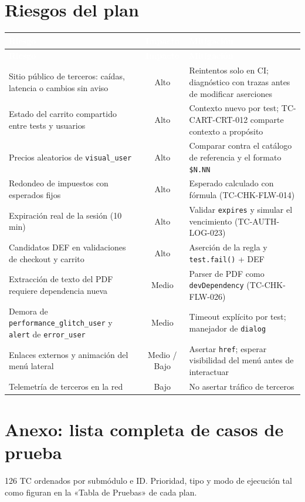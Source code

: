 \documentclass[10pt,a4paper]{article}
\newcommand{\tabhead}{\rowcolor{primary}}
\newcommand{\hcell}[1]{\textcolor{white}{\bfseries #1}}
\newcommand{\zebrarows}{\rowcolors{2}{zebra}{white}}
\begin{document}
\section{Riesgos del plan}
{\zebrarows
\begin{longtable}{|L{0.35\textwidth}|c|L{0.44\textwidth}|}
\hline
\tabhead \hcell{Riesgo} & \hcell{Impacto} & \hcell{Mitigación} \\ \hline
\endfirsthead
\hline
\tabhead \hcell{Riesgo} & \hcell{Impacto} & \hcell{Mitigación} \\ \hline
\endhead
Sitio público de terceros: caídas, latencia o cambios sin aviso & Alto & Reintentos solo en CI; diagnóstico con trazas antes de modificar aserciones \\ \hline
Estado del carrito compartido entre tests y usuarios & Alto & Contexto nuevo por test; TC-CART-CRT-012 comparte contexto a propósito \\ \hline
Precios aleatorios de \texttt{visual\_user} & Alto & Comparar contra el catálogo de referencia y el formato \texttt{\$N.NN} \\ \hline
Redondeo de impuestos con esperados fijos & Alto & Esperado calculado con fórmula (TC-CHK-FLW-014) \\ \hline
Expiración real de la sesión (10 min) & Alto & Validar \texttt{expires} y simular el vencimiento (TC-AUTH-LOG-023) \\ \hline
Candidatos DEF en validaciones de checkout y carrito & Alto & Aserción de la regla y \texttt{test.fail()} + DEF \\ \hline
Extracción de texto del PDF requiere dependencia nueva & Medio & Parser de PDF como \texttt{devDependency} (TC-CHK-FLW-026) \\ \hline
Demora de \texttt{performance\_\allowbreak glitch\_\allowbreak user} y \texttt{alert} de \texttt{error\_user} & Medio & Timeout explícito por test; manejador de \texttt{dialog} \\ \hline
Enlaces externos y animación del menú lateral & Medio / Bajo & Asertar \texttt{href}; esperar visibilidad del menú antes de interactuar \\ \hline
Telemetría de terceros en la red & Bajo & No asertar tráfico de terceros \\ \hline
\end{longtable}}

\clearpage
\appendix
\section{Anexo: lista completa de casos de prueba}
126 TC ordenados por submódulo e ID. Prioridad, tipo y modo de ejecución tal como figuran en la «Tabla de Pruebas» de cada plan.
\end{document}
